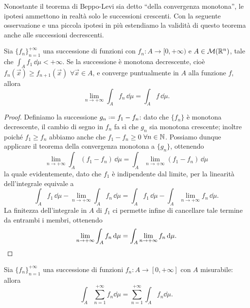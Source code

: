 Nonostante il teorema di Beppo-Levi sia detto ``della convergenza monotona'', le ipotesi ammettono in realtà solo le successioni crescenti.
Con la seguente osservazione e una piccola ipotesi in più estendiamo la validità di questo teorema anche alle successioni decrescenti.
\begin{osservazione} \label{o:convergenza-monotona-decrescente}
	Sia $\{f_n\}_{n=1}^{+\infty}$ una successione di funzioni con $f_n\colon A\to[0,+\infty)$ e $A\in\mathcal M(\mathbb{R}^n)$, tale che $\int_Af_1\,\dd\mu<+\infty$.
	Se la successione è monotona decrescente, cioè $f_n(\vec x)\ge f_{n+1}(\vec x)$ $\forall\vec x\in A$, e converge puntualmente in $A$ alla funzione $f$, allora
	\begin{equation}
		\lim_{n\to+\infty}\int_Af_n\,\dd\mu=\int_Af\,\dd\mu.
	\end{equation}
\end{osservazione}
\begin{proof}
	Definiamo la successione $g_n\defeq f_1-f_n$: dato che $\{f_n\}$ è monotona decrescente, il cambio di segno in $f_n$ fa s\`i che $g_n$ sia monotona crescente; inoltre poich\'e $f_1\ge f_n$ abbiamo anche che $f_1-f_n\ge 0$ $\forall n\in\mathbb{N}$.
	Possiamo dunque applicare il teorema della convergenza monotona a $\{g_n\}$, ottenendo
	\begin{equation}
		\lim_{n\to+\infty}\int_A(f_1-f_n)\,\dd\mu=\int_A\lim_{n\to+\infty}(f_1-f_n)\,\dd\mu
	\end{equation}
	la quale evidentemente, dato che $f_1$ è indipendente dal limite, per la linearità dell'integrale equivale a
	\begin{equation}
		\int_Af_1\,\dd\mu-\lim_{n\to+\infty}\int_Af_n\,\dd\mu=\int_Af_1\,\dd\mu-\int_A\lim_{n\to+\infty}f_n\,\dd\mu.
	\end{equation}
	La finitezza dell'integrale in $A$ di $f_1$ ci permette infine di cancellare tale termine da entrambi i membri, ottenendo
	\begin{equation}
		\lim_{n\to+\infty}\int_Af_n\,\textup{d}\mu=\int_A\lim_{n\to+\infty}f_n\,\textup{d}\mu.\qedhere
	\end{equation}
\end{proof}
\begin{corollario} \label{cor:serie-integrali}
	Sia $\{f_n\}_{n=1}^{+\infty}$ una successione di funzioni $f_n\colon A\to[0,+\infty]$ con $A$ misurabile: allora
	\begin{equation}
		\int_A\sum_{n=1}^{+\infty}f_n\dd\mu=\sum_{n=1}^{+\infty}\int_Af_n\dd\mu.
		\label{eq:serie-integrali}
	\end{equation}
\end{corollario}
